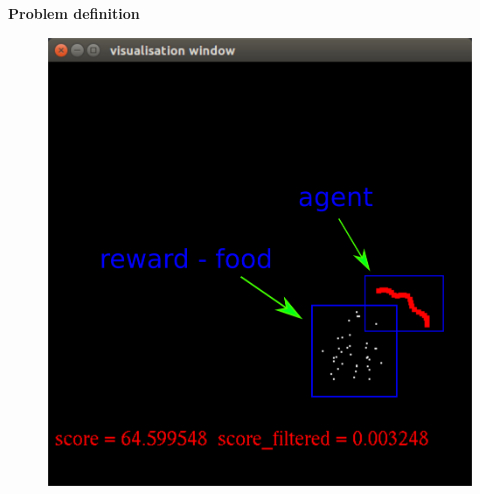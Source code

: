 \documentclass[xcolor=dvipsnames]{beamer}
\begin{document}
\begin{frame}{\bf Problem definition}
\begin{figure}
\begin{minipage}{.5\textwidth}
  \includegraphics[scale=0.2]{../../diagrams/worms_rl_game_desc.png}
\end{minipage}
\end{figure}



\end{frame}
\end{document}
